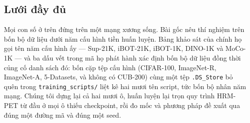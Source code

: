 \documentclass[runningheads]{llncs}
\begin{document}
\subsection{Lưới đầy đủ}
\label{sec:grid}

Mọi con số ở trên đứng trên một mạng xương sống. Bài gốc nêu thí nghiệm trên bốn
bộ dữ liệu dưới năm cấu hình tiền huấn luyện. Bảng khảo sát của chính họ gọi tên
năm cấu hình ấy --- Sup-21K, iBOT-21K, iBOT-1K, DINO-1K và MoCo-1K --- và ba dấu
vết trong mã họ phát hành xác định bốn bộ dữ liệu đồng thời củng cố danh sách
đó: bốn cặp tệp cấu hình (CIFAR-100, ImageNet-R, ImageNet-A, 5-Datasets, và
không có CUB-200) cùng một tệp \texttt{.DS\_Store} bỏ quên trong
\texttt{training\_scripts/} liệt kê hai mươi tên script, tức bốn bộ nhân năm
mạng. Chúng tôi dựng lại cả hai mươi ô, huấn luyện lại trọn quy trình HRM-PET từ
đầu ở mọi ô thiếu checkpoint, rồi đo mốc và phương pháp đề xuất qua đúng một
đường mã và đúng một seed.
\end{document}
